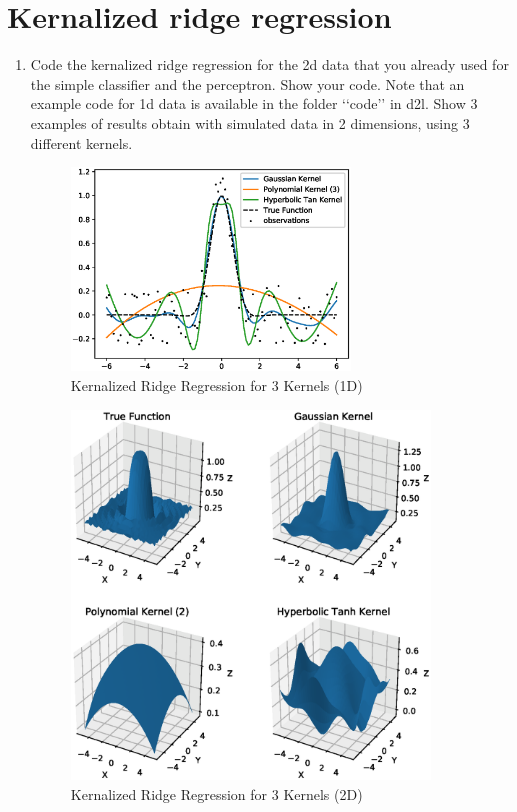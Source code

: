 \documentclass{article}[12pt]
\begin{document}
\section{Kernalized ridge regression}
\begin{enumerate}
\item Code the kernalized ridge regression for the 2d data that you already used for the simple classifier and the perceptron. Show your code. Note that an example code for 1d data is available in the folder \lq\lq{}code\rq\rq{} in d2l.   Show 3 examples of results obtain with simulated data in 2 dimensions, using 3 different kernels. 

\begin{figure}[H]
\centering
\includegraphics[width=0.7\textwidth]{./img/krr_k.eps}
\caption{Kernalized Ridge Regression  for 3 Kernels (1D)}
\end{figure}

\begin{figure}[H]
\centering
\includegraphics[width=0.9\textwidth]{./img/krr_k2.eps}
\caption{Kernalized Ridge Regression  for 3 Kernels (2D)}
\end{figure}



\end{enumerate}
\end{document}
